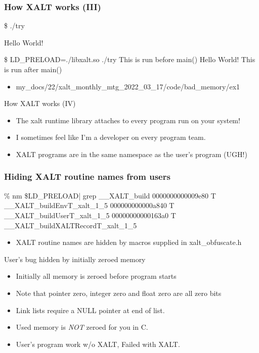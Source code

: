 \documentclass{beamer}
\begin{document}
\begin{frame}[fragile]
    \frametitle{How XALT works (III)}
 {\small
    \begin{semiverbatim}
\$ ./try

Hello World!

\$ LD\_PRELOAD=./libxalt.so  ./try
This is run before main()
Hello World!
This is run after main()
    \end{semiverbatim}
}
  \begin{itemize}
    \item my\_docs/22/xalt\_monthly\_mtg\_2022\_03\_17/code/bad\_memory/ex1
  \end{itemize}

\end{frame}

\begin{frame}{How XALT works (IV)}
  \begin{itemize}
    \item The xalt runtime library attaches to every program run on
      your system!
    \item I sometimes feel like I'm a developer on every program team.
    \item XALT programs are in the same namespace as the user's
      program (UGH!)
  \end{itemize}
\end{frame}



\begin{frame}[fragile]
    \frametitle{Hiding XALT routine names from users}
 {\tiny
    \begin{semiverbatim}
\% nm \$LD\_PRELOAD| grep \_\_XALT\_build
0000000000009e80 T \_\_XALT\_buildEnvT\_xalt\_1\_5
000000000000a840 T \_\_XALT\_buildUserT\_xalt\_1\_5
00000000000163a0 T \_\_XALT\_buildXALTRecordT\_xalt\_1\_5
    \end{semiverbatim}
}
  \begin{itemize}
    \item XALT routine names are hidden by macros supplied in xalt\_obfuscate.h
  \end{itemize}

\end{frame}


\begin{frame}{User's bug hidden by initially zeroed memory}
  \begin{itemize}
    \item Initially all memory is zeroed before program starts
    \item Note that pointer zero, integer zero and float zero are all
      zero bits
    \item Link lists require a NULL pointer at end of list.
    \item Used memory is {\color{red} \emph{NOT}} zeroed for you in C.
    \item User's program work w/o XALT, Failed with XALT.
  \end{itemize}
\end{frame}
\end{document}
